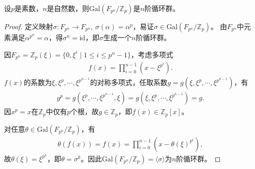 \documentclass[../../main.tex]{subfiles}%
\begin{document}
\begin{theorem}
设$p$是素数，$n$是自然数，则$\mathrm{Gal}(F_{p^n}/\mathbb{Z}_p)$是$n$阶循环群。
\end{theorem}
\begin{proof}

定义映射$\sigma:F_{p^n}\to F_{p^n},\ \sigma(\alpha)=\alpha^p$，易证$\sigma\in\mathrm{Gal}(F_{p^n}/\mathbb{Z}_p)$。
由$F_{p^n}$中元素满足$\alpha^{p^n}=\alpha$，得$\sigma^n=\mathrm{id}$，即$\sigma$生成一个$n$阶循环群。

因$F_{p^n}=\mathbb{Z}_p(\xi)=\{0,\xi^i\mid 1\leqslant i\leqslant p^n-1\}$，考虑多项式
\begin{align*}
f(x)=\prod\limits_{i=0}^{n-1}(x-\xi^{p^i}).
\end{align*}
$f(x)$的系数为$\xi,\xi^p,\cdots,\xi^{p^{n-1}}$的对称多项式，任取系数$g=g(\xi,\xi^p,\cdots,\xi^{p^{n-1}})$，有
\begin{align*}
g^p=g(\xi^p,\cdots,\xi^{p^{n-1}},\xi)=g(\xi,\xi^p,\cdots,\xi^{p^{n-1}})=g.
\end{align*}
因$x^p=x$在$\mathbb{Z}_p$中仅有$p$个根，故$g\in\mathbb{Z}_p$，即$f(x)\in\mathbb{Z}_p[x]$。

对任意$\theta\in\mathrm{Gal}(F_{p^n}/\mathbb{Z}_p)$，有
\begin{align*}
\theta(f(x))=f(x)=\prod\limits_{i=0}^{n-1}(x-\theta(\xi)^{p^i}),
\end{align*}
故$\theta(\xi)=\xi^{p^k}$，即$\theta=\sigma^k$。因此$\mathrm{Gal}(F_{p^n}/\mathbb{Z}_p)=\langle\sigma\rangle$为$n$阶循环群。

\end{proof}
\end{document}
